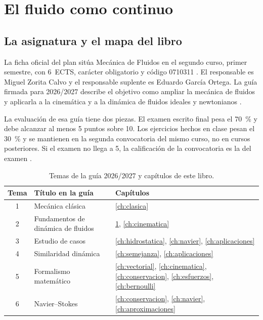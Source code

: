 \chapter{El fluido como continuo}
\label{ch:continuo}

\section{La asignatura y el mapa del libro}

La ficha oficial del plan sitúa Mecánica de Fluidos en el segundo curso, primer semestre, con 6~ECTS, carácter obligatorio y código 0710311 \parencite{ulePlan2026}. El responsable es Miguel Zorita Calvo y el responsable suplente es Eduardo García Ortega. La guía firmada para 2026/2027 describe el objetivo como ampliar la mecánica de fluidos y aplicarla a la cinemática y a la dinámica de fluidos ideales y newtonianos \parencite{uleGuia2026}.

La evaluación de esa guía tiene dos piezas. El examen escrito final pesa el 70~\% y debe alcanzar al menos 5 puntos sobre 10. Los ejercicios hechos en clase pesan el 30~\% y se mantienen en la segunda convocatoria del mismo curso, no en cursos posteriores. Si el examen no llega a 5, la calificación de la convocatoria es la del examen \parencite{uleGuia2026}.

\begin{table}[ht]
\centering
\caption{Temas de la guía 2026/2027 y capítulos de este libro.}
\label{tab:mapa-temas}
\begin{tabular}{@{}clp{}@{}}
\toprule
Tema & Título en la guía & Capítulos \\
\midrule
1 & Mecánica clásica & \ref{ch:clasica} \\
2 & Fundamentos de dinámica de fluidos & \ref{ch:continuo}, \ref{ch:cinematica} \\
3 & Estudio de casos & \ref{ch:hidrostatica}, \ref{ch:navier}, \ref{ch:aplicaciones} \\
4 & Similaridad dinámica & \ref{ch:semejanza}, \ref{ch:aplicaciones} \\
5 & Formalismo matemático & \ref{ch:vectorial}, \ref{ch:cinematica}, \ref{ch:conservacion}, \ref{ch:esfuerzos}, \ref{ch:bernoulli} \\
6 & Navier--Stokes & \ref{ch:conservacion}, \ref{ch:navier}, \ref{ch:aproximaciones} \\
\bottomrule
\end{tabular}
\end{table}

